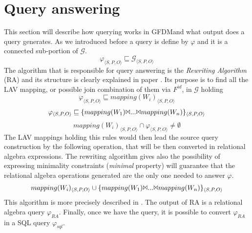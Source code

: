 \documentclass[12pt,a4paper]{report}
\newcommand\systemName{GFDM}
\newcommand\globalQuery{\varphi}
\newcommand\algebraQuery{\varphi_{RA}}
\newcommand\sqlQuery{\varphi_{sql}}
\newcommand\targetGraph{\mathcal{G}}
\newcommand\subject{S}
\newcommand\predicate{P}
\newcommand\object{O}
\newcommand\feature{F}
\newcommand\idFeature{\feature^{id}}
\newcommand\wrapper{W}
\newcommand\triple[1]{#1_{\set{\subject,\predicate,\object}}}
\newcommand\set[1]{\langle #1 \rangle}
\begin{document}
\section{Query answering} \label{Query answering}
This section will describe how querying works in \systemName and what output does a query generates.
%
As we introduced before a query is define by $\globalQuery$ and it is a connected sub-portion of $\targetGraph$.
%
\begin{equation}
    \triple{\globalQuery} \sqsubseteq \triple{\targetGraph}
\end{equation}
%
The algorithm that is responsible for query answering is the \textit{Rewriting Algorithm} (RA) and its structure is clearly explained in paper \cite{TKDE}.
%
Its purpose is to find all the LAV mapping, or possible join combination of them via $\idFeature$, in $\targetGraph$ holding
%
\begin{equation} \label{eq:complete1}
    \triple{\globalQuery} \sqsubseteq \triple{mapping(\wrapper_{i})} 
\end{equation}
\begin{equation} \label{eq:complete2}
    \triple{\globalQuery} \sqsubseteq \triple{\{mapping(\wrapper_{1}) \Bowtie ... \Bowtie mapping(\wrapper_{n})\}}
\end{equation}
\begin{equation} \label{eq:minimal}
     \triple{mapping(\wrapper_{i})} \cap \triple{\globalQuery} \neq \emptyset
\end{equation}
%
The LAV mappings holding this rules would then lead the source query construction by the following operation, that will be then converted in relational algebra expressions.
%
The rewriting algorithm gives also the possibility of expressing minimality constraints (\textit{minimal} property) will guarantee that the relational algebra operations generated are the only one needed to answer $\globalQuery$.
%
\begin{equation}
    \triple{mapping(\wrapper_{i})} \cup \triple{\{mapping(\wrapper_{1}) \Bowtie ... \Bowtie mapping(\wrapper_{n})\}}
\end{equation}
%
This algorithm is more precisely described in \cite{TKDE}.
%
The output of RA is a relational algebra query $\algebraQuery$.
%
Finally, once we have the query, it is possible to convert $\algebraQuery$ in a SQL query $\sqlQuery$.
\end{document}
